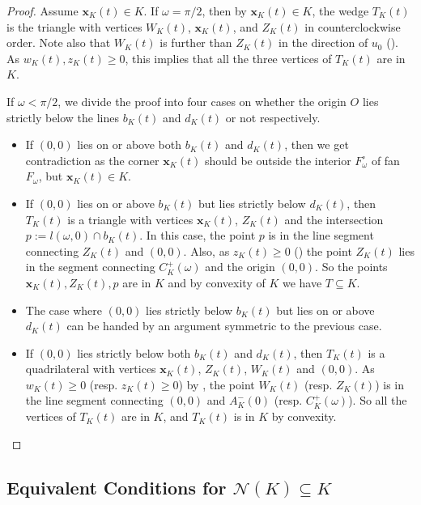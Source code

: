 \begin{proof}
Assume \(\mathbf{x}_K(t) \in K\). If \(\omega = \pi/2\), then by \(\mathbf{x}_K(t) \in K\), the wedge \(T_K(t)\) is the triangle with vertices \(W_K(t)\), \(\mathbf{x}_K(t)\), and \(Z_K(t)\) in counterclockwise order. Note also that \(W_K(t)\) is further than \(Z_K(t)\) in the direction of \(u_0\) (). As \(w_K(t), z_K(t) \geq 0\), this implies that all the three vertices of \(T_K(t)\) are in \(K\).

If \(\omega < \pi/2\), we divide the proof into four cases on whether the origin \(O\) lies strictly below the lines \(b_K(t)\) and \(d_K(t)\) or not respectively.

\begin{itemize}
\tightlist
\item
  If \((0, 0)\) lies on or above both \(b_K(t)\) and \(d_K(t)\), then we get contradiction as the corner \(\mathbf{x}_K(t)\) should be outside the interior \(F_\omega^\circ\) of fan \(F_\omega\), but \(\mathbf{x}_K(t) \in K\).
\item
  If \((0, 0)\) lies on or above \(b_K(t)\) but lies strictly below \(d_K(t)\), then \(T_K(t)\) is a triangle with vertices \(\mathbf{x}_K(t)\), \(Z_K(t)\) and the intersection \(p := l(\omega, 0) \cap b_K(t)\). In this case, the point \(p\) is in the line segment connecting \(Z_K(t)\) and \((0, 0)\). Also, as \(z_K(t) \geq 0\) () the point \(Z_K(t)\) lies in the segment connecting \(C^+_K(\omega)\) and the origin \((0, 0)\). So the points \(\mathbf{x}_K(t), Z_K(t), p\) are in \(K\) and by convexity of \(K\) we have \(T \subseteq K\).
\item
  The case where \((0, 0)\) lies strictly below \(b_K(t)\) but lies on or above \(d_K(t)\) can be handed by an argument symmetric to the previous case.
\item
  If \((0, 0)\) lies strictly below both \(b_K(t)\) and \(d_K(t)\), then \(T_K(t)\) is a quadrilateral with vertices \(\mathbf{x}_K(t)\), \(Z_K(t)\), \(W_K(t)\) and \((0, 0)\). As \(w_K(t) \geq 0\) (resp. \(z_K(t) \geq 0\)) by , the point \(W_K(t)\) (resp. \(Z_K(t)\)) is in the line segment connecting \((0, 0)\) and \(A^-_K(0)\) (resp. \(C^+_K(\omega)\)). So all the vertices of \(T_K(t)\) are in \(K\), and \(T_K(t)\) is in \(K\) by convexity.
\end{itemize}

\end{proof}

\subsection{Equivalent Conditions for \(\mathcal{N}(K) \subseteq K\)}

